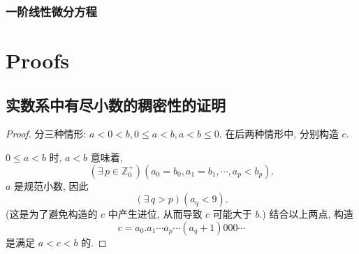 \documentclass{book}
\newcommand{\Exists}{\exists\,}
\numberwithin{equation}{section}
\numberwithin{figure}{section}
\theoremstyle{definition}
\begin{document}
\subsection{一阶线性微分方程}

\appendix
\chapter{Proofs}
\section{实数系中有尽小数的稠密性的证明}
\label{proof:finiteDecimal}
\begin{proof}
  分三种情形: $a<0<b,0\leqslant a<b,a<b\leqslant 0$. 在后两种情形中, 分别构造 $c$.

  $0\leqslant a<b$ 时,
  $a<b$ 意味着,
  \begin{equation*}
    (\Exists p\in \mathbb{Z}_0^+)(a_0=b_0,a_1=b_1,\cdots,a_p<b_p).
  \end{equation*}
  $a$ 是规范小数, 因此
  \begin{equation*}
    (\Exists q>p)(a_q<9).
  \end{equation*}
  (这是为了避免构造的 $c$ 中产生进位, 从而导致 $c$ 可能大于 $b$.)
  结合以上两点, 构造
  \begin{equation*}
    c=a_0.a_1\cdots a_p\cdots (a_q+1)000\cdots
  \end{equation*}
  是满足 $a<c<b$ 的.\qedhere
\end{proof}
\end{document}
